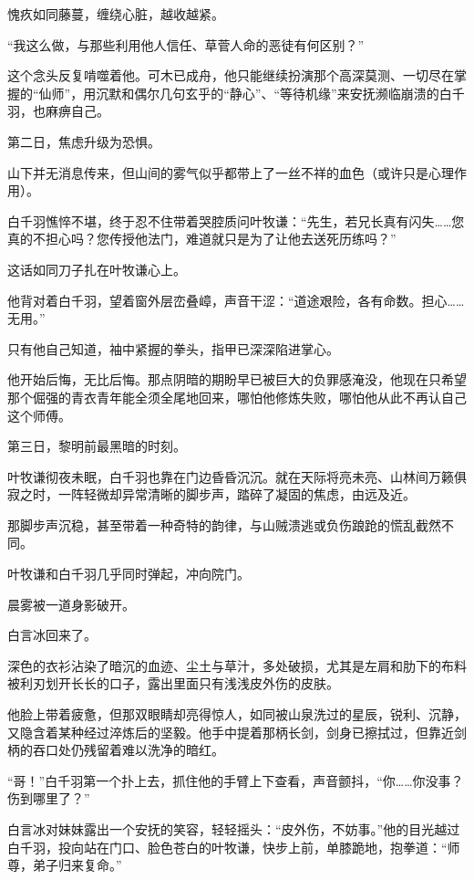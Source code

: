愧疚如同藤蔓，缠绕心脏，越收越紧。

“我这么做，与那些利用他人信任、草菅人命的恶徒有何区别？”

这个念头反复啃噬着他。可木已成舟，他只能继续扮演那个高深莫测、一切尽在掌握的“仙师”，用沉默和偶尔几句玄乎的“静心”、“等待机缘”来安抚濒临崩溃的白千羽，也麻痹自己。

\vspace{2em}

第二日，焦虑升级为恐惧。

山下并无消息传来，但山间的雾气似乎都带上了一丝不祥的血色（或许只是心理作用）。

白千羽憔悴不堪，终于忍不住带着哭腔质问叶牧谦：“先生，若兄长真有闪失……您真的不担心吗？您传授他法门，难道就只是为了让他去送死历练吗？”

这话如同刀子扎在叶牧谦心上。

他背对着白千羽，望着窗外层峦叠嶂，声音干涩：“道途艰险，各有命数。担心……无用。”

只有他自己知道，袖中紧握的拳头，指甲已深深陷进掌心。

他开始后悔，无比后悔。那点阴暗的期盼早已被巨大的负罪感淹没，他现在只希望那个倔强的青衣青年能全须全尾地回来，哪怕他修炼失败，哪怕他从此不再认自己这个师傅。

\vspace{2em}

第三日，黎明前最黑暗的时刻。

叶牧谦彻夜未眠，白千羽也靠在门边昏昏沉沉。就在天际将亮未亮、山林间万籁俱寂之时，一阵轻微却异常清晰的脚步声，踏碎了凝固的焦虑，由远及近。

那脚步声沉稳，甚至带着一种奇特的韵律，与山贼溃逃或负伤踉跄的慌乱截然不同。

叶牧谦和白千羽几乎同时弹起，冲向院门。

晨雾被一道身影破开。

白言冰回来了。

深色的衣衫沾染了暗沉的血迹、尘土与草汁，多处破损，尤其是左肩和肋下的布料被利刃划开长长的口子，露出里面只有浅浅皮外伤的皮肤。

他脸上带着疲惫，但那双眼睛却亮得惊人，如同被山泉洗过的星辰，锐利、沉静，又隐含着某种经过淬炼后的坚毅。他手中提着那柄长剑，剑身已擦拭过，但靠近剑柄的吞口处仍残留着难以洗净的暗红。

“哥！”白千羽第一个扑上去，抓住他的手臂上下查看，声音颤抖，“你……你没事？伤到哪里了？”

白言冰对妹妹露出一个安抚的笑容，轻轻摇头：“皮外伤，不妨事。”他的目光越过白千羽，投向站在门口、脸色苍白的叶牧谦，快步上前，单膝跪地，抱拳道：“师尊，弟子归来复命。”

